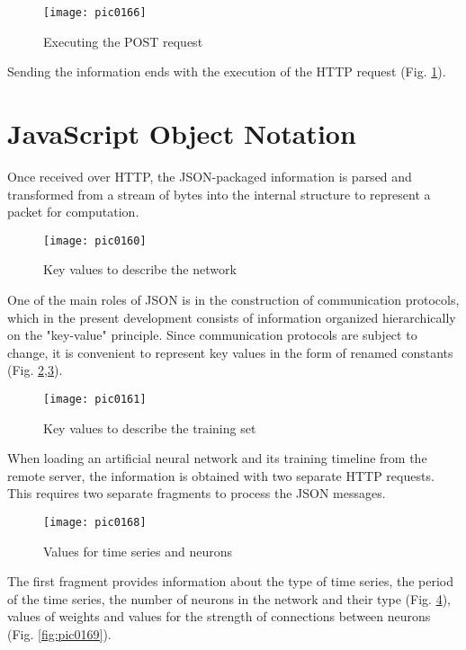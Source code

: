 \begin{figure}[h]
\centering
\texttt{[image: pic0166]}
\caption{Executing the POST request}
\label{fig:pic0166}
\end{figure}
\FloatBarrier

Sending the information ends with the execution of the HTTP request (Fig. \ref{fig:pic0166}).

\section{JavaScript Object Notation}

Once received over HTTP, the JSON-packaged information is parsed and transformed from a stream of bytes into the internal structure to represent a packet for computation.

\begin{figure}[h]
\centering
\texttt{[image: pic0160]}
\caption{Key values to describe the network}
\label{fig:pic0160}
\end{figure}
\FloatBarrier

One of the main roles of JSON is in the construction of communication protocols, which in the present development consists of information organized hierarchically on the "key-value" principle. Since communication protocols are subject to change, it is convenient to represent key values in the form of renamed constants (Fig. \ref{fig:pic0160},\ref{fig:pic0161}).

\begin{figure}[h]
\centering
\texttt{[image: pic0161]}
\caption{Key values to describe the training set}
\label{fig:pic0161}
\end{figure}
\FloatBarrier

When loading an artificial neural network and its training timeline from the remote server, the information is obtained with two separate HTTP requests. This requires two separate fragments to process the JSON messages.

\begin{figure}[h]
\centering
\texttt{[image: pic0168]}
\caption{Values for time series and neurons}
\label{fig:pic0168}
\end{figure}
\FloatBarrier

The first fragment provides information about the type of time series, the period of the time series, the number of neurons in the network and their type (Fig. \ref{fig:pic0168}), values of weights and values for the strength of connections between neurons (Fig. \ref{fig:pic0169}).

